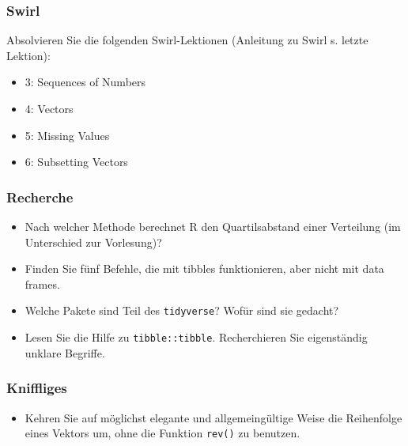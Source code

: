 \documentclass[11pt,german,a4paper]{article}
\providecommand{\tightlist}{%
  \setlength{\itemsep}{0pt}\setlength{\parskip}{0pt}}
\begin{document}
\hypertarget{swirl-1}{%
\subsubsection{Swirl}\label{swirl-1}}

Absolvieren Sie die folgenden Swirl-Lektionen (Anleitung zu Swirl s. letzte Lektion):

\begin{itemize}
\tightlist
\item
  3: Sequences of Numbers
\item
  4: Vectors
\item
  5: Missing Values
\item
  6: Subsetting Vectors
\end{itemize}

\hypertarget{recherche-1}{%
\subsubsection{Recherche}\label{recherche-1}}

\begin{itemize}
\tightlist
\item
  Nach welcher Methode berechnet R den Quartilsabstand einer Verteilung (im Unterschied zur Vorlesung)?
\item
  Finden Sie fünf Befehle, die mit tibbles funktionieren, aber nicht mit data frames.
\item
  Welche Pakete sind Teil des \texttt{tidyverse}? Wofür sind sie gedacht?
\item
  Lesen Sie die Hilfe zu \texttt{tibble::tibble}. Recherchieren Sie eigenständig unklare Begriffe.
\end{itemize}

\hypertarget{kniffliges-1}{%
\subsubsection{Kniffliges}\label{kniffliges-1}}

\begin{itemize}
\tightlist
\item
  Kehren Sie auf möglichst elegante und allgemeingültige Weise die Reihenfolge eines Vektors um, ohne die Funktion \texttt{rev()} zu benutzen.
\end{itemize}
\end{document}
